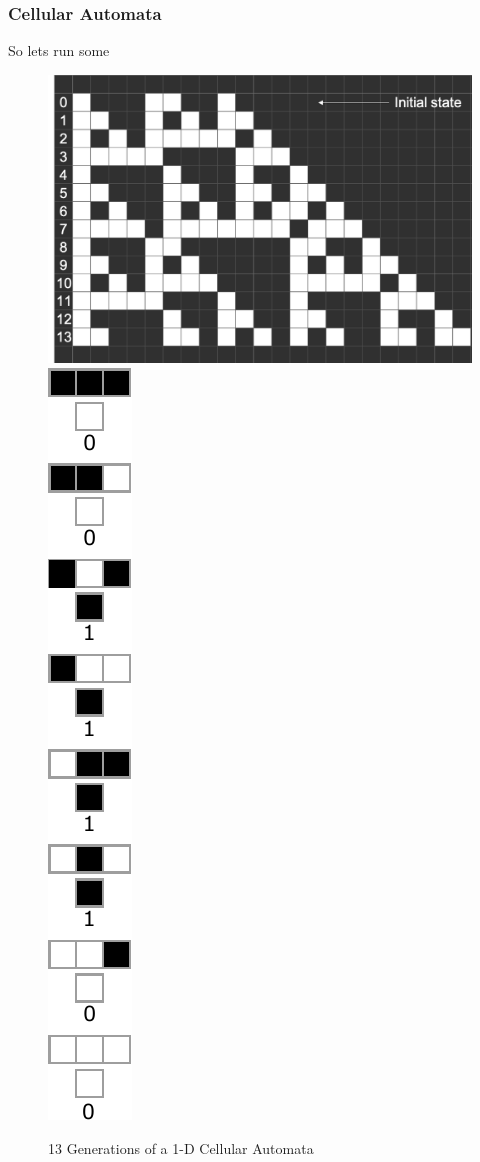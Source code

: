 \documentclass{beamer}
\begin{document}
\begin{frame}
    \frametitle{Cellular Automata}
    So lets run some 
    \begin{figure}
        \includegraphics[scale=0.3]{fig3.png}
        \includegraphics[scale=0.5]{rule60.pdf}
        \caption{13 Generations of a 1-D Cellular Automata}
    \end{figure}
\end{frame}
\end{document}
